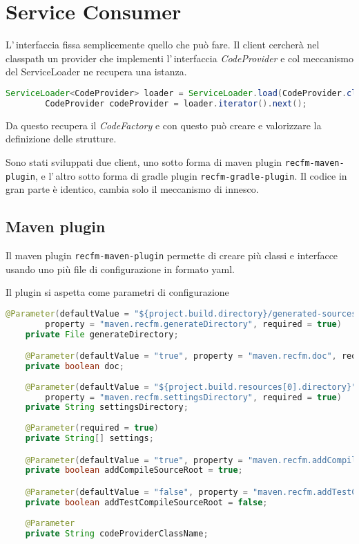 \documentclass[a4paper,10pt]{report}
\begin{document}
\chapter{Service Consumer}
L'\,interfaccia fissa semplicemente quello che può fare.
Il client cercherà nel classpath un provider che implementi l'\,interfaccia
\textsl{CodeProvider} e col meccanismo del ServiceLoader ne recupera una istanza.

\begin{lstlisting}[language=java, caption=recupero del CodeProvider, 
label=code:getCodeProvider]
        ServiceLoader<CodeProvider> loader = ServiceLoader.load(CodeProvider.class);
        CodeProvider codeProvider = loader.iterator().next();
\end{lstlisting}

Da questo recupera il \textsl{CodeFactory} e con questo può creare e valorizzare
la definizione delle strutture.

Sono stati sviluppati due client, uno sotto forma di maven plugin 
\verb!recfm-maven-plugin!, e l'\,altro sotto forma di gradle plugin 
\verb!recfm-gradle-plugin!. Il codice in gran parte è identico, cambia solo il 
meccanismo di innesco.

\section{Maven plugin}
Il maven plugin \verb!recfm-maven-plugin! permette di creare più classi e 
interfacce usando uno più file di configurazione in formato yaml.

Il plugin si aspetta come parametri di configurazione
\begin{lstlisting}[language=java, caption=parametri impostabili del maven plugin, 
label=code:spring-conf]
    @Parameter(defaultValue = "${project.build.directory}/generated-sources/recfm",
        property = "maven.recfm.generateDirectory", required = true)
    private File generateDirectory;

    @Parameter(defaultValue = "true", property = "maven.recfm.doc", required = true)
    private boolean doc;
    
    @Parameter(defaultValue = "${project.build.resources[0].directory}",
        property = "maven.recfm.settingsDirectory", required = true)
    private String settingsDirectory;
    
    @Parameter(required = true)
    private String[] settings;

    @Parameter(defaultValue = "true", property = "maven.recfm.addCompileSourceRoot")
    private boolean addCompileSourceRoot = true;

    @Parameter(defaultValue = "false", property = "maven.recfm.addTestCompileSourceRoot")
    private boolean addTestCompileSourceRoot = false;
    
    @Parameter
    private String codeProviderClassName;
\end{lstlisting}
\end{document}
